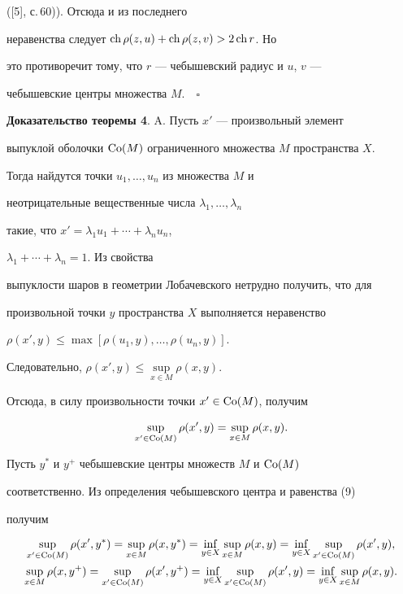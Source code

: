 ([5], с.\,60)). Отсюда и из последнего


неравенства следует $\operatorname{ch} \rho(z,u) + \operatorname{ch} \rho(z,v) > 2\operatorname{ch} r$. Но


это противоречит тому, что $r$ --- чебышевский радиус и $u$, $v$ ---


чебышевские центры множества $M.\quad\square$


\medskip





{\bf Доказательство теоремы 4}. A. Пусть $x'$ --- произвольный элемент


выпуклой оболочки $\operatorname{Co}(M)$ ограниченного множества $M$ пространства $X$.


Тогда найдутся точки $u_{1}, \dotsc,u_{n}$ из множества $M$ и


неотрицательные вещественные числа $\lambda_{1}, \dotsc,\lambda_{n}$


такие, что $x' = \lambda_{1}u_{1} + \dotsb + \lambda_{n}u_{n}$,


$\lambda_{1} + \dotsb + \lambda_{n} = 1$. Из свойства


выпуклости шаров в геометрии Лобачевского нетрудно получить, что для


произвольной точки $y$ пространства $X$ выполняется неравенство


$\rho(x',y) \leq \max[\rho(u_{1},y), \dotsc, \rho(u_{n},y)]$. 


Следовательно, $\rho(x',y) \leq \sup\limits_{x \in M}{\rho(x,y)}$.


Отсюда, в силу произвольности точки $x' \in \operatorname{Co}(M)$, получим


\begin{equation}


\sup\limits_{x' \in \Co(M)}{\rho(x',y)} = \sup\limits_{x \in


M}{\rho(x,y)}.


\end{equation}





Пусть $y^{*}$ и $y^{+}$ чебышевские центры множеств $M$ и $\operatorname{Co}(M)$


соответственно. Из определения чебышевского центра и равенства (9)


получим 


\begin{gather*}


\sup\limits_{x' \in \Co(M)}{\rho(x',y^{*})} = \sup\limits_{x \in


M}{\rho(x,y^{*})} = \inf\limits_{y\in X}{\sup\limits_{x\in M}{\rho


(x,y)}} = \inf\limits_{y \in X}{\sup\limits_{x' \in \Co(M)}{\rho (x',y)}},\\


%


\sup\limits_{x \in M}{\rho(x,y^{+})} = \sup\limits_{x' \in


\Co(M)}{\rho(x',y^{+})} = \inf\limits_{y\in X}{\sup\limits_{x'\in\Co(M)}{\rho


(x',y)}} = \inf\limits_{y \in X}{\sup\limits_{x \in M}{\rho (x,y)}}.


\end{gather*} 


